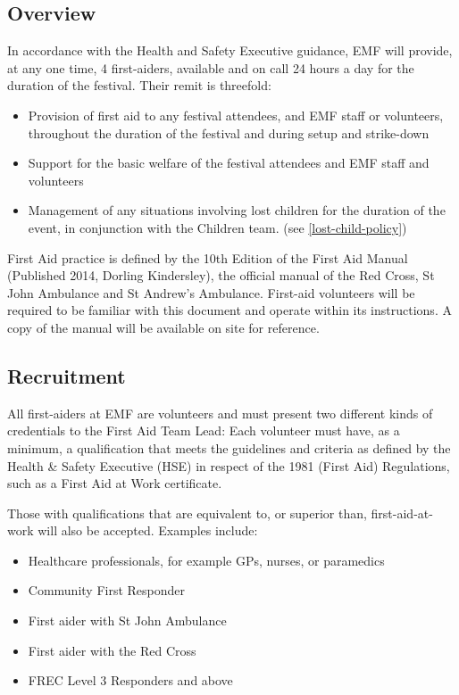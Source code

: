 \subsection{Overview}
In accordance with the Health and Safety Executive guidance, EMF will
provide, at any one time, 4 first-aiders, available and on call 24 hours a day
for the duration of the festival. Their remit is threefold:

\begin{itemize}
  \item Provision of first aid to any festival attendees, and EMF staff or
  volunteers, throughout the duration of the festival and during setup and
  strike-down
  \item Support for the basic welfare of the festival attendees and EMF
  staff and volunteers
  \item Management of any situations involving lost children for the duration of
  the event, in conjunction with the Children team. (see \cref{lost-child-policy})
\end{itemize}

First Aid practice is defined by the 10th Edition of the First Aid Manual
(Published 2014, Dorling Kindersley), the official manual of the Red Cross, St
John Ambulance and St Andrew’s Ambulance. First-aid volunteers will be
required to be familiar with this document and operate within its instructions.
A copy of the manual will be available on site for reference.


\subsection{Recruitment}
All first-aiders at EMF are volunteers and must present two different kinds of
credentials to the First Aid Team Lead: Each volunteer must have, as a minimum,
a qualification that meets the guidelines and criteria as defined by the Health
\& Safety Executive (HSE) in respect of the 1981 (First Aid) Regulations, such
as a First Aid at Work certificate.

Those with qualifications that are equivalent to, or superior than,
first-aid-at-work will also be accepted. Examples include:

\begin{itemize}
  \item Healthcare professionals, for example GPs, nurses, or paramedics
  \item Community First Responder
  \item First aider with St John Ambulance
  \item First aider with the Red Cross
  \item FREC Level 3 Responders and above
\end{itemize}

